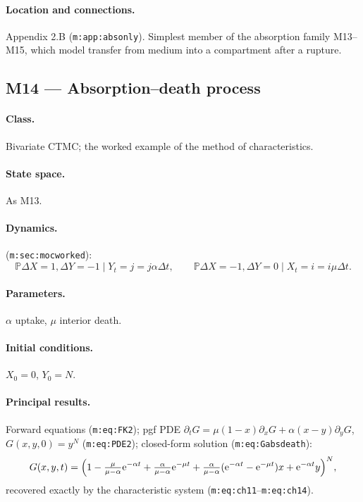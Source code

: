 \documentclass[11pt,a4paper]{article}
\newcommand{\PR}{\mathbb{P}}
\newcommand{\ee}{\mathrm{e}}
\begin{document}
\paragraph{Location and connections.} Appendix 2.B
(\texttt{m:app:absonly}). Simplest member of the absorption family
M13--M15, which model transfer from medium into a compartment after a
rupture.

\subsection{M14 --- Absorption--death process}

\paragraph{Class.} Bivariate CTMC; the worked example of the method of
characteristics.

\paragraph{State space.} As M13.

\paragraph{Dynamics.} (\texttt{m:sec:mocworked}):
\[
\PR{\Delta X=1,\Delta Y=-1\mid Y_t=j}=j\alpha\Delta t,\qquad
\PR{\Delta X=-1,\Delta Y=0\mid X_t=i}=i\mu\Delta t .
\]

\paragraph{Parameters.} $\alpha$ uptake, $\mu$ interior death.

\paragraph{Initial conditions.} $X_0=0$, $Y_0=N$.

\paragraph{Principal results.} Forward equations (\texttt{m:eq:FK2});
pgf PDE $\partial_tG=\mu(1-x)\partial_xG+\alpha(x-y)\partial_yG$,
$G(x,y,0)=y^N$ (\texttt{m:eq:PDE2}); closed-form solution
(\texttt{m:eq:Gabsdeath}):
\[
G(x,y,t)=\Bigl(1-\tfrac{\mu}{\mu-\alpha}\ee^{-\alpha t}
+\tfrac{\alpha}{\mu-\alpha}\ee^{-\mu t}
+\tfrac{\alpha}{\mu-\alpha}(\ee^{-\alpha t}-\ee^{-\mu t})x
+\ee^{-\alpha t}y\Bigr)^{N},
\]
recovered exactly by the characteristic system
(\texttt{m:eq:ch11}--\texttt{m:eq:ch14}).
\end{document}
